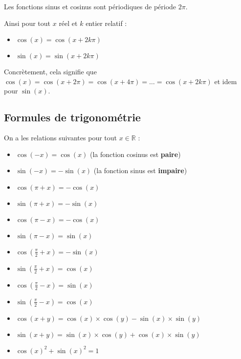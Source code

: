 	Les fonctions sinus et cosinus sont périodiques de période $2\pi$.

	\begin{formula}[Périodicité]
		Ainsi pour tout $x$ réel et $k$ entier relatif :
		\begin{itemize}
			\item $\cos(x) = \cos(x + 2k\pi)$
			\item $\sin(x) = \sin(x + 2k\pi)$
		\end{itemize}
	\end{formula}

	\begin{tip}
		Concrètement, cela signifie que $\cos(x) = \cos(x + 2\pi) = \cos(x + 4\pi) = \dots = \cos(x + 2k\pi)$ et idem pour $\sin(x)$.
	\end{tip}

	\subsection{Formules de trigonométrie}

	\begin{formula}[Formules]
		On a les relations suivantes pour tout $x \in \mathbb{R}$ :
		\begin{itemize}
			\item $\cos(-x) = \cos(x)$ (la fonction cosinus est \textbf{paire})
			\item $\sin(-x) = -\sin(x)$ (la fonction sinus est \textbf{impaire})
			\item $\cos(\pi + x) = -\cos(x)$
			\item $\sin(\pi + x) = -\sin(x)$
			\item $\cos(\pi - x) = -\cos(x)$
			\item $\sin(\pi - x) = \sin(x)$
			\item $\cos \left(\frac{\pi}{2} + x \right) = -\sin(x)$
			\item $\sin \left(\frac{\pi}{2} + x \right) = \cos(x)$
			\item $\cos \left(\frac{\pi}{2} - x \right) = \sin(x)$
			\item $\sin \left(\frac{\pi}{2} - x \right) = \cos(x)$
			\item $\cos(x + y) = \cos(x) \times \cos(y) - \sin(x) \times \sin(y)$
			\item $\sin(x + y) = \sin(x) \times \cos(y) + \cos(x) \times \sin(y)$
			\item $\cos(x)^2 + \sin(x)^2 = 1$
		\end{itemize}
	\end{formula}

